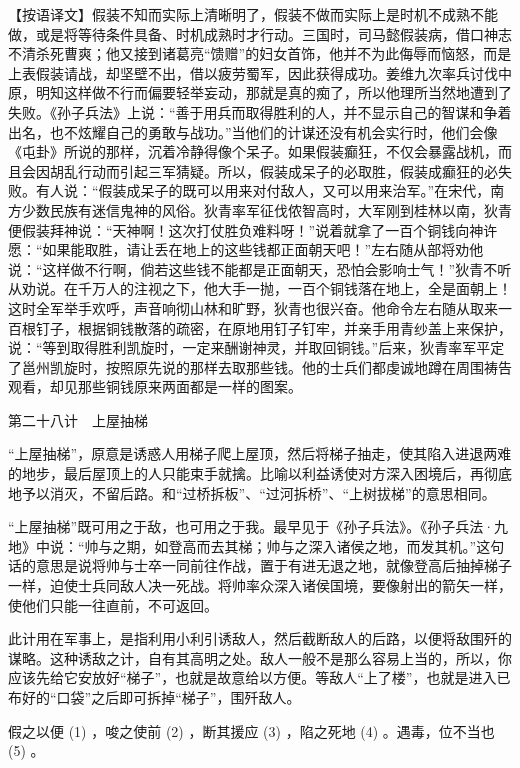 \documentclass[12pt,UTF8]{ctexbook}
\begin{document}
【按语译文】假装不知而实际上清晰明了，假装不做而实际上是时机不成熟不能做，或是将等待条件具备、时机成熟时才行动。三国时，司马懿假装病，借口神志不清杀死曹爽；他又接到诸葛亮“馈赠”的妇女首饰，他并不为此侮辱而恼怒，而是上表假装请战，却坚壁不出，借以疲劳蜀军，因此获得成功。姜维九次率兵讨伐中原，明知这样做不行而偏要轻举妄动，那就是真的痴了，所以他理所当然地遭到了失败。《孙子兵法》上说：“善于用兵而取得胜利的人，并不显示自己的智谋和争着出名，也不炫耀自己的勇敢与战功。”当他们的计谋还没有机会实行时，他们会像《屯卦》所说的那样，沉着冷静得像个呆子。如果假装癫狂，不仅会暴露战机，而且会因胡乱行动而引起三军猜疑。所以，假装成呆子的必取胜，假装成癫狂的必失败。有人说：“假装成呆子的既可以用来对付敌人，又可以用来治军。”在宋代，南方少数民族有迷信鬼神的风俗。狄青率军征伐侬智高时，大军刚到桂林以南，狄青便假装拜神说：“天神啊！这次打仗胜负难料呀！”说着就拿了一百个铜钱向神许愿：“如果能取胜，请让丢在地上的这些钱都正面朝天吧！”左右随从部将劝他说：“这样做不行啊，倘若这些钱不能都是正面朝天，恐怕会影响士气！”狄青不听从劝说。在千万人的注视之下，他大手一抛，一百个铜钱落在地上，全是面朝上！这时全军举手欢呼，声音响彻山林和旷野，狄青也很兴奋。他命令左右随从取来一百根钉子，根据铜钱散落的疏密，在原地用钉子钉牢，并亲手用青纱盖上来保护，说：“等到取得胜利凯旋时，一定来酬谢神灵，并取回铜钱。”后来，狄青率军平定了邕州凯旋时，按照原先说的那样去取那些钱。他的士兵们都虔诚地蹲在周围祷告观看，却见那些铜钱原来两面都是一样的图案。





第二十八计　上屋抽梯


“上屋抽梯”，原意是诱惑人用梯子爬上屋顶，然后将梯子抽走，使其陷入进退两难的地步，最后屋顶上的人只能束手就擒。比喻以利益诱使对方深入困境后，再彻底地予以消灭，不留后路。和“过桥拆板”、“过河拆桥”、“上树拔梯”的意思相同。

“上屋抽梯”既可用之于敌，也可用之于我。最早见于《孙子兵法》。《孙子兵法·九地》中说：“帅与之期，如登高而去其梯；帅与之深入诸侯之地，而发其机。”这句话的意思是说将帅与士卒一同前往作战，置于有进无退之地，就像登高后抽掉梯子一样，迫使士兵同敌人决一死战。将帅率众深入诸侯国境，要像射出的箭矢一样，使他们只能一往直前，不可返回。

此计用在军事上，是指利用小利引诱敌人，然后截断敌人的后路，以便将敌围歼的谋略。这种诱敌之计，自有其高明之处。敌人一般不是那么容易上当的，所以，你应该先给它安放好“梯子”，也就是故意给以方便。等敌人“上了楼”，也就是进入已布好的“口袋”之后即可拆掉“梯子”，围歼敌人。





假之以便 (1) ，唆之使前 (2) ，断其援应 (3) ，陷之死地 (4) 。遇毒，位不当也 (5) 。
\end{document}
